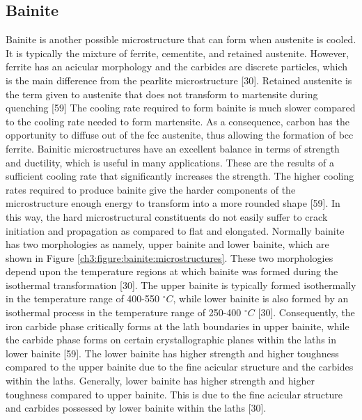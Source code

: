 \documentclass[12pt]{report}
\begin{document}
\subsection{Bainite}
Bainite is another possible microstructure that can form when austenite is cooled. It is typically the mixture of ferrite, cementite, and retained austenite. However, ferrite has an acicular morphology and the carbides are discrete particles, which is the main difference from the pearlite microstructure [30]. Retained austenite is the term given to austenite that does not transform to martensite during quenching [59] The cooling rate required to form bainite is much slower compared to the cooling rate needed to form martensite. As a consequence, carbon has the opportunity to diffuse out of the fcc austenite, thus allowing the formation of bcc ferrite.  
Bainitic microstructures have an excellent balance in terms of strength and ductility, which is useful in many applications. These are the results of a sufficient cooling rate that significantly increases the strength. The higher cooling rates required to produce bainite give the harder components of the microstructure enough energy to transform into a more rounded shape [59]. In this way, the hard microstructural constituents do not easily suffer to crack initiation and propagation as compared to flat and elongated.
Normally bainite has two morphologies as namely, upper bainite and lower bainite, which are shown in Figure \ref{ch3:figure:bainite:microstructures}. These two morphologies depend upon the temperature regions at which bainite was formed during the isothermal transformation [30]. The upper bainite is typically formed isothermally in the temperature range of 400-550 $^\circ C$, while lower bainite is also formed by an isothermal process in the temperature range of 250-400 $^\circ C$ [30]. Consequently, the iron carbide phase critically forms at the lath boundaries in upper bainite, while the carbide phase forms on certain crystallographic planes within the laths in lower bainite [59]. The lower bainite has higher strength and higher toughness compared to the upper bainite due to the fine acicular structure and the carbides within the laths. Generally, lower bainite has higher strength and higher toughness compared to upper bainite. This is due to the fine acicular structure and carbides possessed by lower bainite within the laths [30].
     
\end{document}
